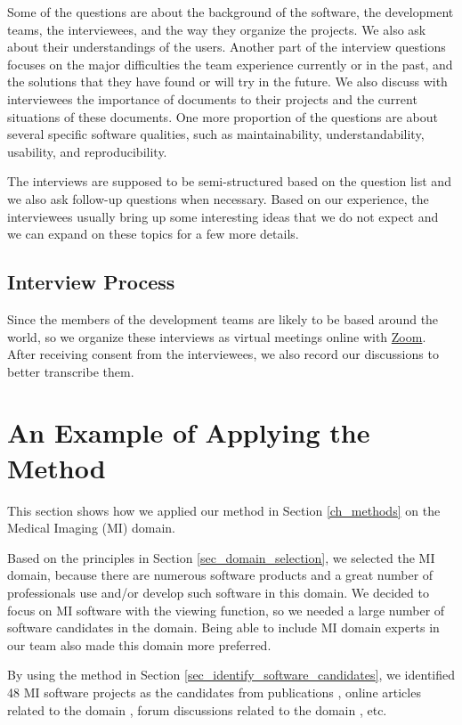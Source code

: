 Some of the questions are about the background of the software, the development teams, the interviewees, and the way they organize the projects. We also ask about their understandings of the users. Another part of the interview questions focuses on the major difficulties the team experience currently or in the past, and the solutions that they have found or will try in the future. We also discuss with interviewees the importance of documents to their projects and the current situations of these documents. One more proportion of the questions are about several specific software qualities, such as maintainability, understandability, usability, and reproducibility.

The interviews are supposed to be semi-structured based on the question list and we also ask follow-up questions when necessary. Based on our experience, the interviewees usually bring up some interesting ideas that we do not expect and we can expand on these topics for a few more details.

\subsection{Interview Process}
Since the members of the development teams are likely to be based around the world, so we organize these interviews as virtual meetings online with \hyperlink{https://zoom.us/}{Zoom}. After receiving consent from the interviewees, we also record our discussions to better transcribe them.

\section{An Example of Applying the Method}
\label{sec_applying_method}

This section shows how we applied our method in Section \ref{ch_methods} on the Medical Imaging (MI) domain.

Based on the principles in Section \ref{sec_domain_selection}, we selected the MI domain, because there are numerous software products and a great number of professionals use and/or develop such software in this domain. We decided to focus on MI software with the viewing function, so we needed a large number of software candidates in the domain. Being able to include MI domain experts in our team also made this domain more preferred.

By using the method in Section \ref{sec_identify_software_candidates}, we identified 48 MI software projects as the candidates from publications \cite{Bjorn2017} \cite{Bruhschwein2019} \cite{Haak2015}, online articles related to the domain \cite{Emms2019} \cite{Hasan2020} \cite{Mu2019}, forum discussions related to the domain \cite{Samala2014}, etc.


